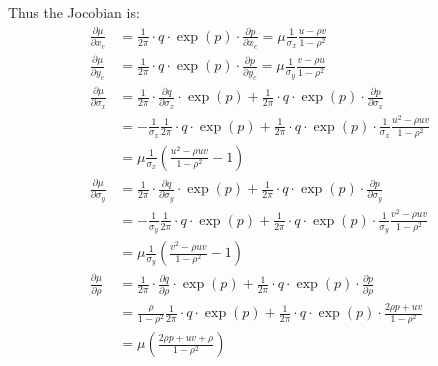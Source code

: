 \documentclass[11pt]{article} %
\begin{document}
Thus the Jocobian is:
\begin{align*}
\frac{\partial \mu}{\partial x_c} &= \frac{1}{2\pi} \cdot q\cdot \exp\left(p\right) \cdot \frac{\partial p}{\partial x_c} = \mu \frac{1}{\sigma_x}\frac{u -\rho v}{1-\rho^2}\\
\frac{\partial \mu}{\partial y_c} &= \frac{1}{2\pi} \cdot q\cdot \exp\left(p\right) \cdot \frac{\partial p}{\partial y_c} = \mu \frac{1}{\sigma_y}\frac{v -\rho u}{1-\rho^2} \\
\frac{\partial \mu}{\partial \sigma_x} &= \frac{1}{2\pi} \cdot \frac{\partial q}{\partial \sigma_x} \cdot \exp\left(p\right) + \frac{1}{2\pi} \cdot q\cdot \exp\left(p\right) \cdot \frac{\partial p}{\partial \sigma_x}\\
&=-\frac{1}{\sigma_x} \frac{1}{2\pi}\cdot q \cdot \exp\left(p\right) + \frac{1}{2\pi} \cdot q\cdot \exp\left(p\right) \cdot \frac{1}{\sigma_x}\frac{u^2 -\rho uv}{1-\rho^2}\\
&=\mu\frac{1}{\sigma_x}\left(\frac{u^2-\rho uv}{1-\rho^2} - 1\right)\\
\frac{\partial \mu}{\partial \sigma_y} &= \frac{1}{2\pi} \cdot \frac{\partial q}{\partial \sigma_y} \cdot \exp\left(p\right) + \frac{1}{2\pi} \cdot q\cdot \exp\left(p\right) \cdot \frac{\partial p}{\partial \sigma_y}\\
&=-\frac{1}{\sigma_y} \frac{1}{2\pi}\cdot q \cdot \exp\left(p\right) + \frac{1}{2\pi} \cdot q\cdot \exp\left(p\right) \cdot \frac{1}{\sigma_y}\frac{v^2 -\rho uv}{1-\rho^2}\\
&=\mu\frac{1}{\sigma_y}\left(\frac{v^2-\rho uv}{1-\rho^2} - 1\right)\\
\frac{\partial \mu}{\partial \rho} &= \frac{1}{2\pi} \cdot \frac{\partial q}{\partial \rho} \cdot \exp\left(p\right) + \frac{1}{2\pi} \cdot q\cdot \exp\left(p\right) \cdot \frac{\partial p}{\partial \rho}\\
&=\frac{\rho}{1 - \rho^2} \frac{1}{2\pi}\cdot q \cdot \exp\left(p\right) + \frac{1}{2\pi} \cdot q\cdot \exp\left(p\right) \cdot \frac{2\rho p + uv}{1-\rho^2}\\
&=\mu\left(\frac{2\rho p + uv + \rho}{1-\rho^2}\right)
\end{align*}
\end{document}
